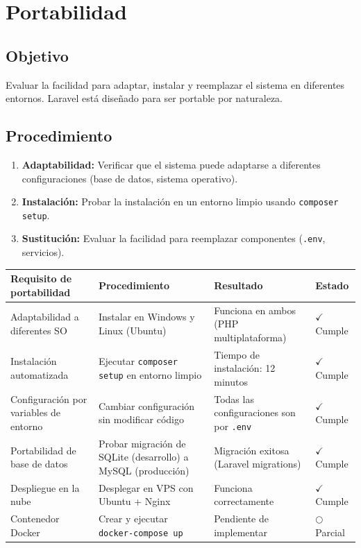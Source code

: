 \documentclass[stu]{apa7}
\begin{document}
\section{Portabilidad}

\subsection{Objetivo}

Evaluar la facilidad para adaptar, instalar y reemplazar el sistema en diferentes entornos. Laravel está diseñado para ser portable por naturaleza.

\subsection{Procedimiento}

\begin{enumerate}
    \item \textbf{Adaptabilidad:} Verificar que el sistema puede adaptarse a diferentes configuraciones (base de datos, sistema operativo).
    \item \textbf{Instalación:} Probar la instalación en un entorno limpio usando \texttt{composer setup}.
    \item \textbf{Sustitución:} Evaluar la facilidad para reemplazar componentes (\texttt{.env}, servicios).
\end{enumerate}

\begin{longtable}{|L{4.5cm}|L{4.5cm}|C{3cm}|C{1.5cm}|}
\hline
{}
\textbf{Requisito de portabilidad} & \textbf{Procedimiento} & \textbf{Resultado} & \textbf{Estado} \\
\hline
Adaptabilidad a diferentes SO & Instalar en Windows y Linux (Ubuntu) & Funciona en ambos (PHP multiplataforma) & $\checkmark$ Cumple \\
\hline
Instalación automatizada & Ejecutar \texttt{composer setup} en entorno limpio & Tiempo de instalación: 12 minutos & $\checkmark$ Cumple \\
\hline
Configuración por variables de entorno & Cambiar configuración sin modificar código & Todas las configuraciones son por \texttt{.env} & $\checkmark$ Cumple \\
\hline
Portabilidad de base de datos & Probar migración de SQLite (desarrollo) a MySQL (producción) & Migración exitosa (Laravel migrations) & $\checkmark$ Cumple \\
\hline
Despliegue en la nube & Desplegar en VPS con Ubuntu + Nginx & Funciona correctamente & $\checkmark$ Cumple \\
\hline
Contenedor Docker & Crear y ejecutar \texttt{docker-compose up} & Pendiente de implementar & $\bigcirc$ Parcial \\
\hline
\end{longtable}
\end{document}
